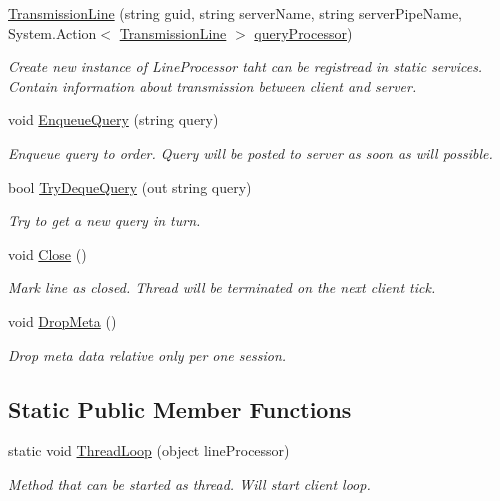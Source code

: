 \begin{DoxyCompactItemize}
\item 
\mbox{\hyperlink{class_pipes_provider_1_1_transmission_line_a20398f48516f0fc5fe0700b01b7fc6d7}{Transmission\+Line}} (string guid, string server\+Name, string server\+Pipe\+Name, System.\+Action$<$ \mbox{\hyperlink{class_pipes_provider_1_1_transmission_line}{Transmission\+Line}} $>$ \mbox{\hyperlink{class_pipes_provider_1_1_transmission_line_a08bf6cb803ea32dd416afcc12ee866f5}{query\+Processor}})
\begin{DoxyCompactList}\small\item\em Create new instance of Line\+Processor taht can be registread in static services. Contain information about transmission between client and server. \end{DoxyCompactList}\item 
void \mbox{\hyperlink{class_pipes_provider_1_1_transmission_line_ac27fedfbe0edfdcb4fbf4509c76f858f}{Enqueue\+Query}} (string query)
\begin{DoxyCompactList}\small\item\em Enqueue query to order. Query will be posted to server as soon as will possible. \end{DoxyCompactList}\item 
bool \mbox{\hyperlink{class_pipes_provider_1_1_transmission_line_a9ab008a66866d2bdb29f4a33e563e3d1}{Try\+Deque\+Query}} (out string query)
\begin{DoxyCompactList}\small\item\em Try to get a new query in turn. \end{DoxyCompactList}\item 
void \mbox{\hyperlink{class_pipes_provider_1_1_transmission_line_a4aa28b1d29a2b0b6fb2af6f046fdf56a}{Close}} ()
\begin{DoxyCompactList}\small\item\em Mark line as closed. Thread will be terminated on the next client tick. \end{DoxyCompactList}\item 
void \mbox{\hyperlink{class_pipes_provider_1_1_transmission_line_a954265d9816b253b75caf7b6b7e1ba86}{Drop\+Meta}} ()
\begin{DoxyCompactList}\small\item\em Drop meta data relative only per one session. \end{DoxyCompactList}\end{DoxyCompactItemize}
\subsection*{Static Public Member Functions}
\begin{DoxyCompactItemize}
\item 
static void \mbox{\hyperlink{class_pipes_provider_1_1_transmission_line_ab56219b10bad03085b5d23e48ad59ec3}{Thread\+Loop}} (object line\+Processor)
\begin{DoxyCompactList}\small\item\em Method that can be started as thread. Will start client loop. \end{DoxyCompactList}\end{DoxyCompactItemize}
